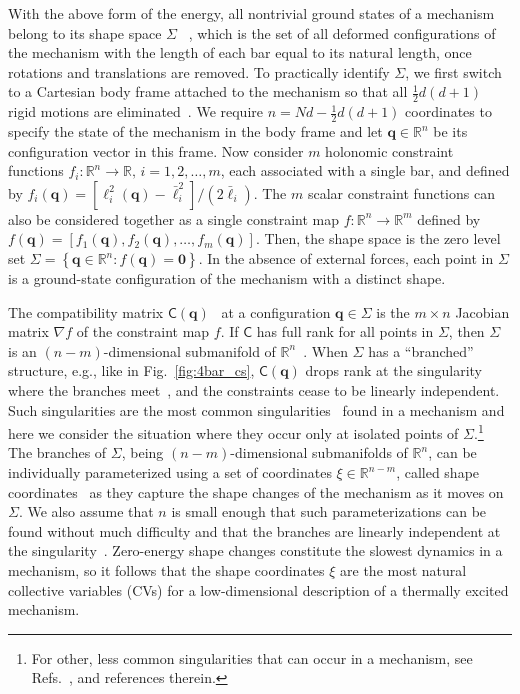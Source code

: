 With the above form of the energy, all nontrivial ground states of a mechanism belong to its shape space $\Sigma$ ~\cite{kendall1989,mezey1993,kendall1999}, which is the set of all deformed configurations of the mechanism with the length of each bar equal to its natural length, once rotations and translations are removed.
To practically identify $\Sigma$, we first switch to a Cartesian body frame attached to the mechanism so that all $\frac{1}{2}d(d+1)$ rigid motions are eliminated~\cite{herschbach1959,echenique2011}.
We require $n = Nd - \frac{1}{2}d(d+1)$ coordinates to specify the state of the mechanism in the body frame and let $\bm{q} \in \mathbb{R}^{n}$ be its configuration vector in this frame.
Now consider $m$ holonomic constraint functions $f_i: \mathbb{R}^{n} \to \mathbb{R},\,i=1,2,\ldots,m$, each associated with a single bar, and defined by $f_i(\bm{q}) = [\ell_i^2(\bm{q}) - \bar{\ell}_i^2]/(2\bar{\ell}_i)$.
The $m$ scalar constraint functions can also be considered together as a single constraint map $f: \mathbb{R}^{n} \to \mathbb{R}^m$ defined by $f(\bm{q}) = [f_1(\bm{q}), f_2(\bm{q}), \ldots, f_m(\bm{q})]$.
Then, the shape space is the zero level set $\Sigma = \left\{\bm{q} \in \mathbb{R}^{n}: f(\bm{q}) = \bm{0} \right\}$.
In the absence of external forces, each point in $\Sigma$ is a ground-state configuration of the mechanism with a distinct shape.

The compatibility matrix $\mathsf{C}(\bm{q})$~\cite{pellegrino1986,lubensky2015} at a configuration $\bm{q} \in \Sigma$ is the $m \times n$ Jacobian matrix $\nabla f$ of the constraint map $f$.
If $\mathsf{C}$ has full rank for all points in $\Sigma$, then $\Sigma$ is an $(n - m)$-dimensional submanifold of $\mathbb{R}^{n}$~\cite{leimkuhler2005,lee2013}.
When $\Sigma$ has a ``branched'' structure, e.g., like in Fig.~\ref{fig:4bar_cs}, $\mathsf{C}(\bm{q})$ drops rank at the singularity where the branches meet~\cite{lopez-custodio2020,muller2019}, and the constraints cease to be linearly independent.
Such singularities are the most common singularities~\cite{lopez-custodio2019,lopez-custodio2020} found in a mechanism and here we consider the situation where they occur only at isolated points of $\Sigma$.\footnote{For other, less common singularities that can occur in a mechanism, see Refs.~\cite{lopez-custodio2020,muller2019,muller2017}, and references therein.}
The branches of $\Sigma$, being $(n-m)$-dimensional submanifolds of $\mathbb{R}^{n}$, can be individually parameterized using a set of coordinates $\xi \in \mathbb{R}^{n-m}$, called shape coordinates~\cite{littlejohn1995} as they capture the shape changes of the mechanism as it moves on $\Sigma$.
We also assume that $n$ is small enough that such parameterizations can be found without much difficulty and that
the branches are linearly independent at the singularity~\cite{lopez-custodio2020}.
Zero-energy shape changes constitute the slowest dynamics in a mechanism, so it follows that the shape coordinates $\xi$ are the most natural collective variables (CVs) for a low-dimensional description of a thermally excited mechanism.

